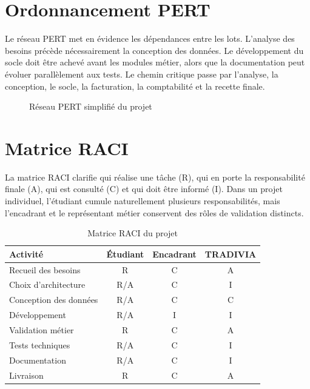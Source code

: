 \documentclass[12pt,a4paper,oneside]{report}
\begin{document}
\section{Ordonnancement PERT}
Le réseau PERT met en évidence les dépendances entre les lots. L'analyse des besoins précède nécessairement la conception des données. Le développement du socle doit être achevé avant les modules métier, alors que la documentation peut évoluer parallèlement aux tests. Le chemin critique passe par l'analyse, la conception, le socle, la facturation, la comptabilité et la recette finale.

\begin{figure}[H]\centering
{}
\caption{Réseau PERT simplifié du projet}
\end{figure}

\section{Matrice RACI}
La matrice RACI clarifie qui réalise une tâche (R), qui en porte la responsabilité finale (A), qui est consulté (C) et qui doit être informé (I). Dans un projet individuel, l'étudiant cumule naturellement plusieurs responsabilités, mais l'encadrant et le représentant métier conservent des rôles de validation distincts.

\begin{table}[H]\centering
\caption{Matrice RACI du projet}
\begin{tabularx}{\textwidth}{Y c c c}
\toprule \textbf{Activité} & \textbf{Étudiant} & \textbf{Encadrant} & \textbf{TRADIVIA}\\ \midrule
Recueil des besoins & R & C & A\\
Choix d'architecture & R/A & C & I\\
Conception des données & R/A & C & C\\
Développement & R/A & I & I\\
Validation métier & R & C & A\\
Tests techniques & R/A & C & I\\
Documentation & R/A & C & I\\
Livraison & R & C & A\\
\bottomrule
\end{tabularx}
\end{table}
\end{document}
